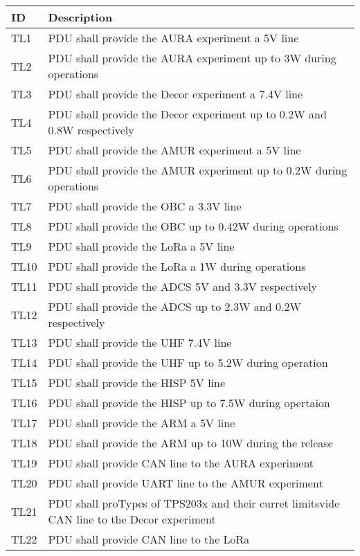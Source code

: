 \begin{tabular}{p{1cm}p{13cm}} \toprule
	ID & Description \\ \midrule
	

	

TL1 & PDU shall provide the AURA experiment a 5V line\\
TL2 & PDU shall provide the AURA experiment up to 3W during operations\\
TL3 & PDU shall provide the Decor experiment a 7.4V line\\
TL4 & PDU shall provide the Decor experiment up to 0.2W and 0.8W respectively\\
TL5 & PDU shall provide the AMUR experiment a 5V line\\
TL6 & PDU shall provide the AMUR experiment up to 0.2W during operations\\
TL7 & PDU shall provide the OBC a 3.3V line\\
TL8 & PDU shall provide the OBC up to 0.42W during operations\\
TL9 & PDU shall provide the LoRa a 5V line\\
TL10 & PDU shall provide the LoRa a 1W during operations\\
TL11 & PDU shall provide the ADCS 5V and 3.3V respectively\\
TL12 & PDU shall provide the ADCS up to 2.3W and 0.2W respectively\\
TL13 & PDU shall provide the UHF 7.4V line\\
TL14 & PDU shall provide the UHF up to 5.2W during operation\\
TL15 & PDU shall provide the HISP 5V line\\
TL16 & PDU shall provide the HISP up to 7.5W during opertaion\\
TL17 & PDU shall provide the ARM a 5V line\\
TL18 & PDU shall provide the ARM up to 10W during the release\\ 
TL19 & PDU shall provide CAN line to the AURA experiment\\
TL20 & PDU shall provide UART line to the AMUR experiment\\
TL21 & PDU shall proTypes of TPS203x and their curret limitsvide CAN line to the Decor experiment\\
TL22 & PDU shall provide CAN line to the LoRa\\
\bottomrule
\end{tabular}\\ \\ \\ \\
\label{Tab:req1}



